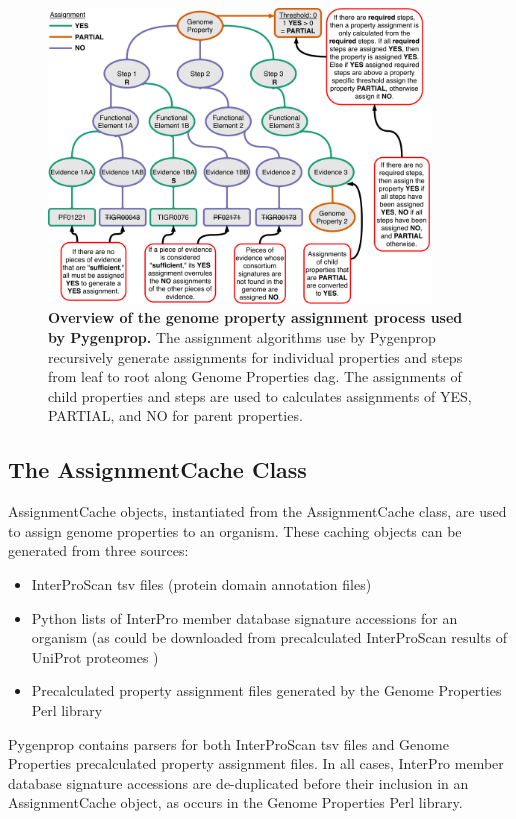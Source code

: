 \begin{figure}[!ht]
  \centering
	\includegraphics[width=0.90\textwidth]{media/Pygenprop_Assignment.pdf}
	 \caption[Overview of the genome property assignment process used by 
Pygenprop.]{\textbf{Overview of the genome property assignment process used by 
Pygenprop.} The assignment algorithms use by Pygenprop recursively generate 
assignments for individual properties and steps from leaf to root along Genome 
Properties \gls{dag}. The assignments of child properties and steps are used to 
calculates assignments of YES, PARTIAL, and NO for parent properties.}
	 \label{fig:propertyassignment}
\end{figure}

\subsection{The AssignmentCache Class} \label{AssignmentCache}

AssignmentCache objects, instantiated from the AssignmentCache class, are used 
to assign genome properties to an organism. These caching objects can be 
generated from three sources: 

\begin{itemize}
\item InterProScan \gls{tsv} files (protein domain annotation files) 
\item Python lists of InterPro member database signature accessions for an 
organism (as could be downloaded from precalculated InterProScan results of 
UniProt proteomes \cite{uniprot2014uniprot})
\item Precalculated property assignment files generated by the Genome Properties 
Perl library
\end{itemize}
Pygenprop contains parsers for both InterProScan \gls{tsv} files and Genome 
Properties precalculated property assignment files. In all cases, InterPro 
member database signature accessions are de-duplicated before their inclusion in 
an AssignmentCache object, as occurs in the Genome Properties Perl library.

